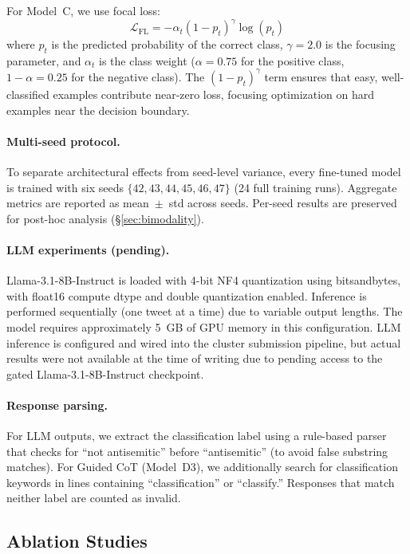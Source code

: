\documentclass[10pt,a4paper]{article}
\begin{document}
For Model~C, we use focal loss:
\begin{equation}
    \mathcal{L}_{\text{FL}} = -\alpha_t (1 - p_t)^\gamma \log(p_t)
\end{equation}
where $p_t$ is the predicted probability of the correct class, $\gamma = 2.0$ is the focusing parameter, and $\alpha_t$ is the class weight ($\alpha = 0.75$ for the positive class, $1 - \alpha = 0.25$ for the negative class). The $(1-p_t)^\gamma$ term ensures that easy, well-classified examples contribute near-zero loss, focusing optimization on hard examples near the decision boundary.

\paragraph{Multi-seed protocol.}
To separate architectural effects from seed-level variance, every fine-tuned model is trained with six seeds $\{42, 43, 44, 45, 46, 47\}$ (24 full training runs). Aggregate metrics are reported as mean~$\pm$~std across seeds. Per-seed results are preserved for post-hoc analysis (\S\ref{sec:bimodality}).

\paragraph{LLM experiments (pending).}
Llama-3.1-8B-Instruct is loaded with 4-bit NF4 quantization using bitsandbytes, with float16 compute dtype and double quantization enabled. Inference is performed sequentially (one tweet at a time) due to variable output lengths. The model requires approximately 5~GB of GPU memory in this configuration. LLM inference is configured and wired into the cluster submission pipeline, but actual results were not available at the time of writing due to pending access to the gated Llama-3.1-8B-Instruct checkpoint.

\paragraph{Response parsing.}
For LLM outputs, we extract the classification label using a rule-based parser that checks for ``not antisemitic'' before ``antisemitic'' (to avoid false substring matches). For Guided CoT (Model~D3), we additionally search for classification keywords in lines containing ``classification'' or ``classify.'' Responses that match neither label are counted as invalid.

\subsection{Ablation Studies}
\label{sec:ablations}
\end{document}
